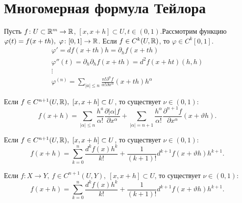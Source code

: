 \section{Многомерная формула Тейлора}
Пусть $ f\colon U \subset \mathbb{R}^{m} \to  \mathbb{R}$, $ [x, x+h] \subset U, t \in (0, 1)$.Рассмотрим функцию $ \varphi (t) = f(x+th), ~\varphi \colon [0, 1] \to  \mathbb{R}$. Если $ f \in C^{k}(U, \mathbb{R})$, то $ \varphi \in  C^{k}[0, 1]$.
\begin{align*}
    \varphi ' = df(x + th)h = \partial _h f(x+th) \\
    \varphi ''(t) = \partial _h\partial _h f(x + th) = d^2f(x+ht)(h, h) \\
    \vdots
    \\
    \varphi ^{(n)} = \sum_{\lvert a \rvert \le  n} \frac{n! \partial ^{n} f}{\alpha ! \partial x^{\alpha }}  (x+ th) h^{\alpha }
\end{align*}
\begin{thm}
    Если $ f \in C^{n+1}(U, \mathbb{R}), ~[x, x+h] \subset U$, то существует $ \nu \in (0, 1)\colon $
    \[
	f(x+h) = \sum_{\lvert \alpha  \rvert \le n}^{} \frac{h^{ a  }}{\alpha !} \frac{\partial \lvert \alpha  \rvert f}{\partial x^{\alpha }} + \sum_{\lvert \alpha  \rvert = n+1}^{} \frac{h^{\alpha }}{\alpha !} \frac{\partial ^{n+1} f}{\partial x^{\alpha }} (x + \vartheta h)
    .\] 
\end{thm}
\begin{thm}
    Если $ f \in C^{n+1}(U, \mathbb{R}), ~[x, x+h] \subset U$, то существует $ \nu \in (0, 1)\colon $
    \[
	f(x+h) = \sum_{k=0}^{n}  \frac{d^{k} f(x) h^{k}}{k!} + \frac{1}{(k+1)!} d^{k+1}f(x+ \vartheta h)h^{k+1}
    .\] 
\end{thm}
\begin{thm}
    Если $ f\colon X \to  Y, ~f \in C^{n+1}(U, Y), ~[x, x+h] \subset U$, то существует $ \nu \in (0, 1)\colon $
    \[
	f(x+h) = \sum_{k=0}^{n}  \frac{d^{k} f(x) h^{k}}{k!} + \frac{1}{(k+1)!} d^{k+1}f(x+ \vartheta h)h^{k+1}
    .\] 
\end{thm}
